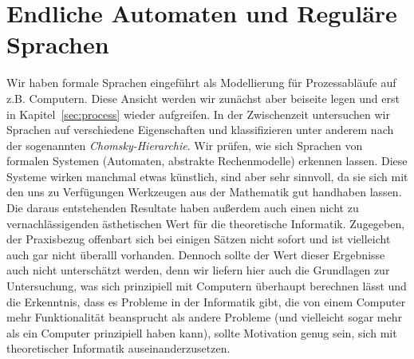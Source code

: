 \documentclass[11pt, a4paper]{article}
\theoremstyle{definition}
\theoremstyle{plain}
\numberwithin{equation}{section}
\begin{document}
\newpage
\section{Endliche Automaten und Reguläre Sprachen}\label{sec:regular}
Wir haben formale Sprachen eingeführt als Modellierung für Prozessabläufe auf z.B. Computern. Diese Ansicht werden wir zunächst aber beiseite legen und erst in Kapitel~\ref{sec:process} wieder aufgreifen. In der Zwischenzeit untersuchen wir Sprachen auf verschiedene Eigenschaften und klassifizieren unter anderem nach der sogenannten \textit{Chomsky-Hierarchie}. Wir prüfen, wie sich Sprachen von formalen Systemen (Automaten, abstrakte Rechenmodelle) erkennen lassen. Diese Systeme wirken manchmal etwas künstlich, sind aber sehr sinnvoll, da sie sich mit den uns zu Verfügungen Werkzeugen aus der Mathematik gut handhaben lassen. Die daraus entstehenden Resultate haben außerdem auch einen nicht zu vernachlässigenden ästhetischen Wert für die theoretische Informatik. Zugegeben, der Praxisbezug offenbart sich bei einigen Sätzen nicht sofort und ist vielleicht auch gar nicht überalll vorhanden. Dennoch sollte der Wert dieser Ergebnisse auch nicht unterschätzt werden, denn wir liefern hier auch die Grundlagen zur Untersuchung, was sich prinzipiell mit Computern überhaupt berechnen lässt und die Erkenntnis, dass es Probleme in der Informatik gibt, die von einem Computer mehr Funktionalität beansprucht als andere Probleme (und vielleicht sogar mehr als ein Computer prinzipiell haben kann), sollte Motivation genug sein, sich mit theoretischer Informatik auseinanderzusetzen.
\end{document}
